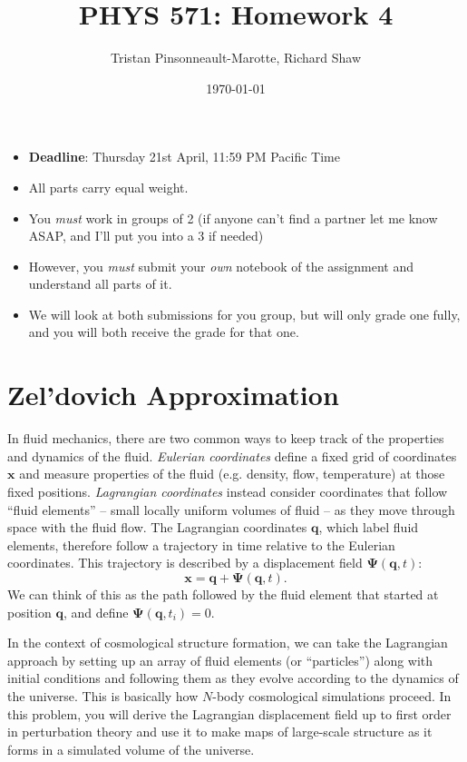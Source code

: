 \documentclass[12pt]{article}
\author{Tristan Pinsonneault-Marotte, Richard Shaw}
\title{PHYS 571: Homework 4}
\date{\today}
\begin{document}
\maketitle


\begin{itemize}
    \item \textbf{Deadline}: Thursday 21st April, 11:59 PM Pacific Time
    \item All parts carry equal weight.
    \item You \emph{must} work in groups of 2 (if anyone can't find a partner let me know ASAP, and I'll put you into a 3 if needed)
    \item However, you \emph{must} submit your \emph{own} notebook of the assignment and understand all parts of it.
    \item We will look at both submissions for you group, but will only grade one fully, and you will both receive the grade for that one.
\end{itemize}

\section{Zel'dovich Approximation}

In fluid mechanics, there are two common ways to keep track of the properties
and dynamics of the fluid. \emph{Eulerian coordinates} define a fixed grid of
coordinates $\mathbf{x}$ and measure properties of the fluid (e.g. density,
flow, temperature) at those fixed positions. \emph{Lagrangian coordinates}
instead consider coordinates that follow ``fluid elements'' -- small locally
uniform volumes of fluid -- as they move through space with the fluid flow. The
Lagrangian coordinates $\mathbf{q}$, which label fluid elements, therefore
follow a trajectory in time relative to the Eulerian coordinates. This
trajectory is described by a displacement field $\mathbf{\Psi}(\mathbf{q}, t)$:
\begin{equation}
    \mathbf{x} = \mathbf{q} + \mathbf{\Psi}(\mathbf{q}, t) \text{.}
\end{equation}
We can think of this as the path followed by the fluid element that started at
position $\mathbf{q}$, and define $\mathbf{\Psi}(\mathbf{q}, t_i) = 0$.

In the context of cosmological structure formation, we can take the Lagrangian
approach by setting up an array of fluid elements (or ``particles'') along with
initial conditions and following them as they evolve according to the dynamics
of the universe. This is basically how $N$-body cosmological simulations
proceed. In this problem, you will derive the Lagrangian displacement field up
to first order in perturbation theory and use it to make maps of large-scale
structure as it forms in a simulated volume of the universe.
\end{document}
